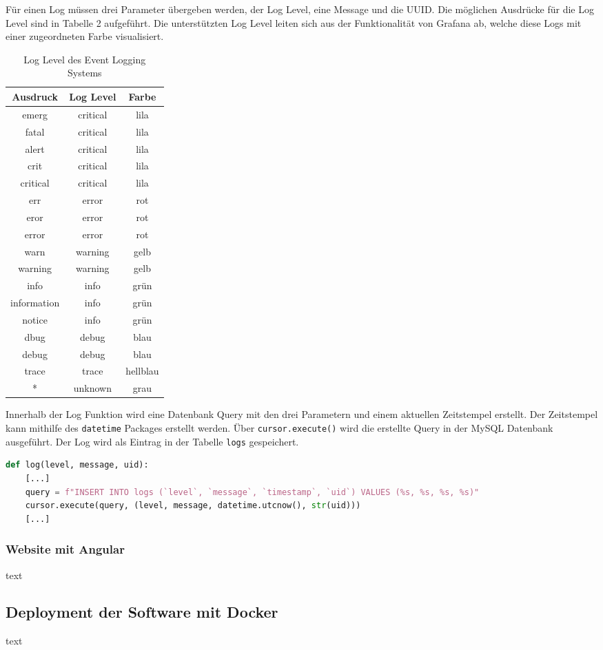 Für einen Log müssen drei Parameter übergeben werden, der Log Level, eine Message und die UUID. Die möglichen Ausdrücke für die Log Level sind in Tabelle 2 aufgeführt. Die unterstützten Log Level leiten sich aus der Funktionalität von Grafana ab, welche diese Logs mit einer zugeordneten Farbe visualisiert.

\begin{table}[H]
\centering
\begin{tabular}{c|c|c}
\textbf{Ausdruck} & \textbf{Log Level} & \textbf{Farbe}\\
\hline
emerg & critical & lila\\
fatal & critical & lila\\
alert & critical & lila\\
crit & critical & lila\\
critical & critical & lila\\
err & error & rot\\
eror & error & rot\\
error & error & rot\\
warn & warning & gelb\\
warning & warning & gelb\\
info & info & grün\\
information & info & grün\\
notice & info & grün\\
dbug & debug & blau\\
debug & debug & blau\\
trace & trace & hellblau\\
* & unknown & grau
\end{tabular}
\caption{Log Level des Event Logging Systems}
\end{table}

Innerhalb der Log Funktion wird eine Datenbank Query mit den drei Parametern und einem aktuellen Zeitstempel erstellt. Der Zeitstempel kann mithilfe des \texttt{datetime} Packages erstellt werden. Über \texttt{cursor.execute()} wird die erstellte Query in der MySQL Datenbank ausgeführt. Der Log wird als Eintrag in der Tabelle \texttt{logs} gespeichert. 

\begin{lstlisting}[language=Python]
def log(level, message, uid):
    [...]
    query = f"INSERT INTO logs (`level`, `message`, `timestamp`, `uid`) VALUES (%s, %s, %s, %s)"
    cursor.execute(query, (level, message, datetime.utcnow(), str(uid)))
    [...]
\end{lstlisting}

\subsubsection{Website mit Angular}
text
\subsection{Deployment der Software mit Docker}
text